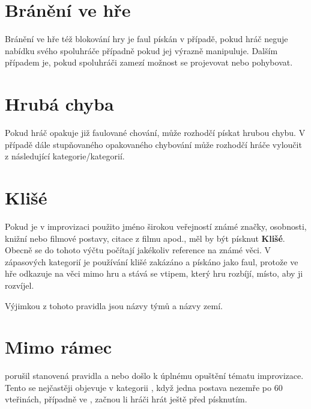 \needspace{5cm} \section{Bránění ve hře} \label{bránění ve hře}  
 
Bránění ve hře též blokování hry je faul pískán v případě, pokud hráč neguje nabídku svého spoluhráče případně pokud jej výrazně manipuluje. Dalším případem je, pokud spoluhráči zamezí možnost se projevovat nebo pohybovat. 
 
 
\needspace{5cm} \section{Hrubá chyba} \label{hrubá chyba}  
Pokud hráč opakuje již faulované chování, může rozhodčí pískat hrubou chybu. V případě dále stupňovaného opakovaného chybování může rozhodčí hráče vyloučit z následující kategorie/kategorií. 
 
\needspace{5cm} \section{Klišé} \label{klišé}  
 
Pokud je v improvizaci použito jméno širokou veřejností známé značky, osobnosti, knižní nebo filmové postavy, citace z filmu apod., měl by být písknut  \textbf{Klišé}{}. Obecně se do tohoto výčtu počítají jakékoliv reference na známé věci. V zápasových kategorií je používání klišé zakázáno a pískáno jako faul, protože ve hře odkazuje na věci mimo hru a stává se vtipem, který hru rozbíjí, místo, aby ji rozvíjel. 
  
 
Výjimkou z tohoto pravidla jsou názvy  týmů a názvy zemí. 
 
 
\needspace{5cm} \section{Mimo rámec} \label{mimo rámec}  
 
 porušil stanovená pravidla  a nebo došlo k úplnému opuštění tématu improvizace. Tento  se nejčastěji objevuje v kategorii , když jedna postava nezemře po 60 vteřinách, případně ve , začnou li hráči hrát ještě před písknutím. 
 
